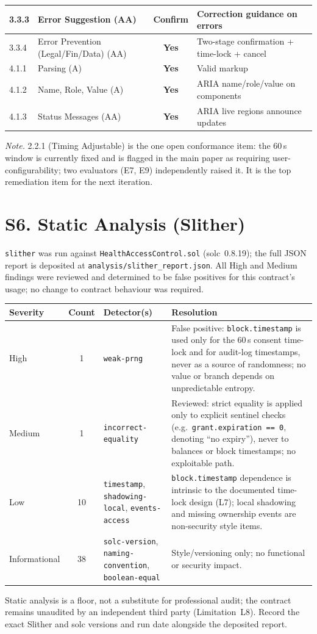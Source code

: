 \documentclass[10pt]{article}
\newcommand{\yes}{\textcolor{green!55!black}{\textbf{Yes}}}
\newcommand{\conf}{\textcolor{orange!80!black}{Confirm}}
\begin{document}
\begin{center}
\begin{longtable}{|l|p{5.3cm}|c|p{4.2cm}|}
3.3.3 & Error Suggestion (AA) & \conf & Correction guidance on errors\\\hline
3.3.4 & Error Prevention (Legal/Fin/Data) (AA) & \yes & Two-stage confirmation + time-lock + cancel\\\hline
4.1.1 & Parsing (A) & \yes & Valid markup\\\hline
4.1.2 & Name, Role, Value (A) & \yes & ARIA name/role/value on components\\\hline
4.1.3 & Status Messages (AA) & \yes & ARIA live regions announce updates\\\hline
\end{longtable}
\end{center}
{\footnotesize \textit{Note.} 2.2.1 (Timing Adjustable) is the one open conformance item: the 60\,s window is
currently fixed and is flagged in the main paper as requiring user-configurability; two evaluators (E7, E9)
independently raised it. It is the top remediation item for the next iteration.}

\section*{S6. Static Analysis (Slither)}
\texttt{slither} was run against \texttt{HealthAccessControl.sol} (solc~0.8.19); the full JSON report is deposited at \texttt{analysis/slither\_report.json}. All High and Medium findings were reviewed and determined to be false positives for this contract's usage; no change to contract behaviour was required.
\begin{center}\small
\begin{tabular}{|l|c|l|p{6.0cm}|}
\hline\textbf{Severity} & \textbf{Count} & \textbf{Detector(s)} & \textbf{Resolution}\\\hline
High & 1 & \texttt{weak-prng} & False positive: \texttt{block.timestamp} is used only for the 60\,s consent time-lock and for audit-log timestamps, never as a source of randomness; no value or branch depends on unpredictable entropy.\\\hline
Medium & 1 & \texttt{incorrect-equality} & Reviewed: strict equality is applied only to explicit sentinel checks (e.g.\ \texttt{grant.expiration == 0}, denoting ``no expiry''), never to balances or block timestamps; no exploitable path.\\\hline
Low & 10 & \texttt{timestamp}, \texttt{shadowing-local}, \texttt{events-access} & \texttt{block.timestamp} dependence is intrinsic to the documented time-lock design (L7); local shadowing and missing ownership events are non-security style items.\\\hline
Informational & 38 & \texttt{solc-version}, \texttt{naming-convention}, \texttt{boolean-equal} & Style/versioning only; no functional or security impact.\\\hline
\end{tabular}
\end{center}
{\footnotesize Static analysis is a floor, not a substitute for professional audit; the contract remains unaudited by an independent third party (Limitation~L8). Record the exact Slither and solc versions and run date alongside the deposited report.}
\end{document}

